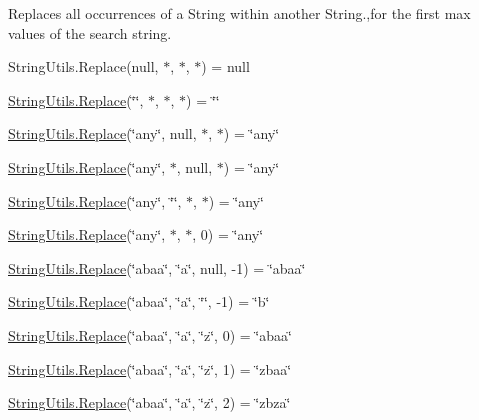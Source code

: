Replaces all occurrences of a String within another String.,for the first max values of the search string. 

String\+Utils.\+Replace(null, $\ast$, $\ast$, $\ast$) = null 

\hyperlink{class_ultimate_1_1_utilities_1_1_string_utils_ad0d61b4c80159b2e6e367a37ab3e8af9}{String\+Utils.\+Replace}(\char`\"{}\char`\"{}, $\ast$, $\ast$, $\ast$) = \char`\"{}\char`\"{} 

\hyperlink{class_ultimate_1_1_utilities_1_1_string_utils_ad0d61b4c80159b2e6e367a37ab3e8af9}{String\+Utils.\+Replace}(\char`\"{}any\char`\"{}, null, $\ast$, $\ast$) = \char`\"{}any\char`\"{} 

\hyperlink{class_ultimate_1_1_utilities_1_1_string_utils_ad0d61b4c80159b2e6e367a37ab3e8af9}{String\+Utils.\+Replace}(\char`\"{}any\char`\"{}, $\ast$, null, $\ast$) = \char`\"{}any\char`\"{} 

\hyperlink{class_ultimate_1_1_utilities_1_1_string_utils_ad0d61b4c80159b2e6e367a37ab3e8af9}{String\+Utils.\+Replace}(\char`\"{}any\char`\"{}, \char`\"{}\char`\"{}, $\ast$, $\ast$) = \char`\"{}any\char`\"{} 

\hyperlink{class_ultimate_1_1_utilities_1_1_string_utils_ad0d61b4c80159b2e6e367a37ab3e8af9}{String\+Utils.\+Replace}(\char`\"{}any\char`\"{}, $\ast$, $\ast$, 0) = \char`\"{}any\char`\"{} 

\hyperlink{class_ultimate_1_1_utilities_1_1_string_utils_ad0d61b4c80159b2e6e367a37ab3e8af9}{String\+Utils.\+Replace}(\char`\"{}abaa\char`\"{}, \char`\"{}a\char`\"{}, null, -\/1) = \char`\"{}abaa\char`\"{} 

\hyperlink{class_ultimate_1_1_utilities_1_1_string_utils_ad0d61b4c80159b2e6e367a37ab3e8af9}{String\+Utils.\+Replace}(\char`\"{}abaa\char`\"{}, \char`\"{}a\char`\"{}, \char`\"{}\char`\"{}, -\/1) = \char`\"{}b\char`\"{} 

\hyperlink{class_ultimate_1_1_utilities_1_1_string_utils_ad0d61b4c80159b2e6e367a37ab3e8af9}{String\+Utils.\+Replace}(\char`\"{}abaa\char`\"{}, \char`\"{}a\char`\"{}, \char`\"{}z\char`\"{}, 0) = \char`\"{}abaa\char`\"{} 

\hyperlink{class_ultimate_1_1_utilities_1_1_string_utils_ad0d61b4c80159b2e6e367a37ab3e8af9}{String\+Utils.\+Replace}(\char`\"{}abaa\char`\"{}, \char`\"{}a\char`\"{}, \char`\"{}z\char`\"{}, 1) = \char`\"{}zbaa\char`\"{} 

\hyperlink{class_ultimate_1_1_utilities_1_1_string_utils_ad0d61b4c80159b2e6e367a37ab3e8af9}{String\+Utils.\+Replace}(\char`\"{}abaa\char`\"{}, \char`\"{}a\char`\"{}, \char`\"{}z\char`\"{}, 2) = \char`\"{}zbza\char`\"{} 

